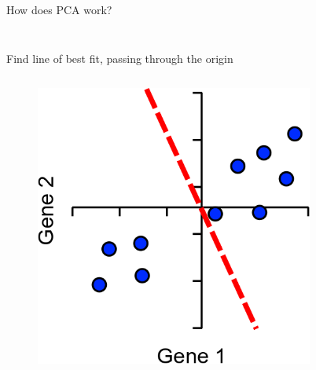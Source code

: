\begin{frame}[allowframebreaks]{How does PCA work?}
\begin{columns}
\begin{column}{0.5\textwidth}
\begin{figure}
        \end{figure}
    \end{column}
    \end{columns}

    \framebreak

    Find line of best fit, passing through the origin
    \vspace{1cm}
    \begin{columns}
    \begin{column}{0.33\textwidth}
        \begin{figure}
            \centering
            \includegraphics[width=1\textwidth,keepaspectratio]{images/dul/dim-reduce/line-fit.png}
        \end{figure}
    \end{column}
    \begin{column}{0.33\textwidth}
        \begin{figure}
            \centering

\end{figure}
\end{column}
\end{columns}
\end{frame}
